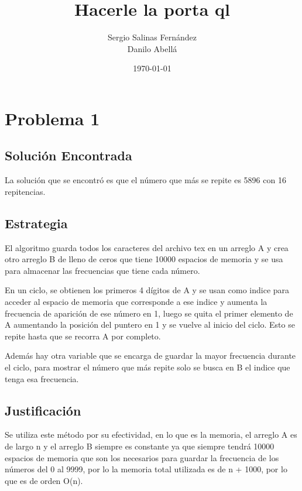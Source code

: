 \documentclass[12pt]{article}
\title{Hacerle la porta ql}								%
\author{Sergio Salinas Fern\'andez \\
Danilo Abellá}								%
\date{\today}											%
\begin{document}
\maketitle


\tableofcontents
\pagebreak



\section{Problema 1}

\subsection{Solución Encontrada}

La solución que se encontró es que el número que más se repite es 5896 con 16 repitencias.


\subsection{Estrategia}

El algoritmo guarda todos los caracteres del archivo tex en un arreglo A y crea otro arreglo B de lleno de ceros que tiene 10000 espacios de memoria y se usa para almacenar las frecuencias que tiene cada número.

En un ciclo, se obtienen los primeros 4 dígitos de A y se usan como indice para acceder al espacio de memoria que corresponde a ese indice y aumenta la frecuencia de aparición de ese número en 1, luego se quita el primer elemento de A aumentando la posición del puntero en 1 y se vuelve al inicio del ciclo. Esto se repite hasta que se recorra A por completo.


Además hay otra variable que se encarga de guardar la mayor frecuencia durante el ciclo, para mostrar el número que más repite solo se busca en B el indice que tenga esa frecuencia.

\subsection{Justificación}

Se utiliza este método por su efectividad, en lo que es la memoria, el arreglo A es de largo n y el arreglo B siempre es constante ya que siempre tendrá 10000 espacios de memoria que son los necesarios para guardar la frecuencia de los números del 0 al 9999, por lo la memoria total utilizada es de n + 1000, por lo que es de orden O(n).
\end{document}
